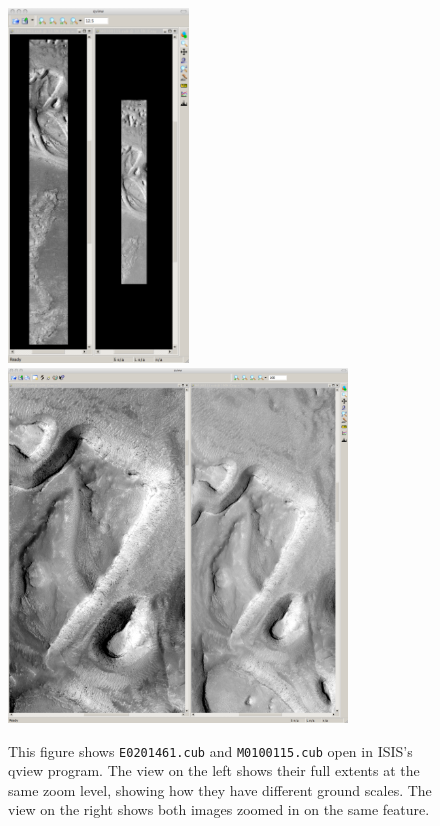 \begin{figure}[t!]
\begin{minipage}{5.2in}
\includegraphics[height=3.7in]{images/p19-images_400px.png}
\hfill
\includegraphics[height=3.7in]{images/p19-images_zoom_500px.png}
\end{minipage}
\hfill
\begin{minipage}{1.3in}
\caption[P19 images open in qview zoomed in]{
    \label{p19-images}
    This figure shows \texttt{E0201461.cub} and \texttt{M0100115.cub}
    open in ISIS's qview program.  The view on the left shows their
    full extents at the same zoom level, showing how they have
    different ground scales.  The view on the right shows both images
    zoomed in on the same feature.  }
\end{minipage}
\end{figure}

